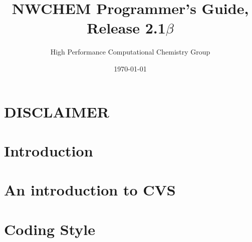 \setlength{\parskip}{6pt}

\newcommand{\TRUE}{\verb+.true.+}
\newcommand{\FALSE}{\verb+.false.+}
\newcommand{\nwchemversion}{2.1$\beta$}
\newcommand{\nwchemyear}{1997}



\title{\bf\Large NWCHEM Programmer's Guide, Release \nwchemversion}
\author{High Performance Computational Chemistry Group}
\date{\today}
\maketitle

\chapter*{\center DISCLAIMER}


\clearpage

\tableofcontents

\clearpage


\chapter{Introduction}


\chapter{An introduction to CVS}



\chapter{Coding Style}


